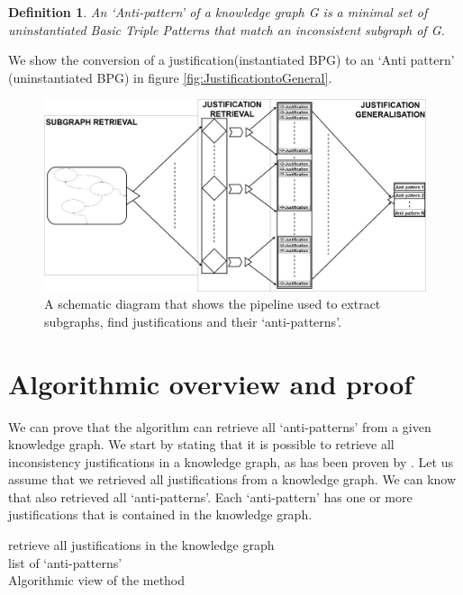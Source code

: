 \documentclass[11pt,letterpaper ,oneside ]{book}
\newtheorem{definition}{Definition}
\begin{document}
	\begin{definition} 
		An \textit{`Anti-pattern'} of a knowledge graph G is a minimal set of uninstantiated Basic Triple Patterns that match an inconsistent subgraph of G.
	\end{definition}
	
	We show the conversion of a justification(instantiated BPG) to an `Anti pattern' (uninstantiated BPG) in figure \ref{fig:JustificationtoGeneral}.
	
	\begin{figure}
		\includegraphics[width=\linewidth]{images/SimplifiedPipelineMissingPart.png}
		\caption{A schematic diagram that shows the pipeline used to extract subgraphs, find justifications and their `anti-patterns'.}
		\label{fig:simplePipeline}
	\end{figure}
	
	\section{Algorithmic overview and proof}
	We can prove that the algorithm can retrieve all `anti-patterns' from a given knowledge graph. We start by stating that it is possible to retrieve all inconsistency justifications in a knowledge graph, as has been proven by \cite{Horridge:2009}. Let us assume that we retrieved all justifications from a knowledge graph. We can know that also retrieved all `anti-patterns'. Each `anti-pattern' has one or more justifications that is contained in the knowledge graph. \\
	
	\begin{algorithm}
		
		retrieve all justifications in the knowledge graph\\
		\Return list of `anti-patterns'\\
		\caption{Algorithmic view of the method}
	\end{algorithm}
	
\end{document}

